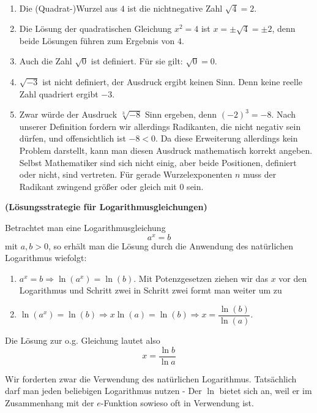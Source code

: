 \documentclass[ngerman, 12pt]{nssheetxea}
\begin{document}
\begin{example} \ 
\begin{enumerate}
\item Die (Quadrat-)Wurzel aus $4$ ist die nichtnegative Zahl $\sqrt{4}=2$. 
\item Die Lösung der quadratischen Gleichung $x^2=4$ ist $x=\pm \sqrt{4}=\pm 2$, denn beide Lösungen führen zum Ergebnis von $4$. 
\item Auch die Zahl $\sqrt{0}$ ist definiert. Für sie gilt: $\sqrt{0}=0$.
\item $\sqrt{-3}$ ist nicht definiert, der Ausdruck ergibt keinen Sinn. Denn keine reelle Zahl quadriert ergibt $-3$. 
\item Zwar würde der Ausdruck $\sqrt[3]{-8}$ Sinn ergeben, denn $(-2)^3=-8$. Nach unserer Definition fordern wir allerdings Radikanten, die nicht negativ sein dürfen, und offensichtlich ist $-8<0$. Da diese Erweiterung allerdings kein Problem darstellt, kann man diesen Ausdruck mathematisch korrekt angeben. Selbst Mathematiker sind sich nicht einig, aber beide Positionen, definiert oder nicht, sind vertreten. Für gerade Wurzelexponenten $n$ muss der Radikant zwingend größer oder gleich mit $0$ sein.
\end{enumerate}
\end{example}


\begin{theorem} \textbf{(Lösungsstrategie für Logarithmusgleichungen)} \par
Betrachtet man eine Logarithmusgleichung 
\[ a^x = b\]
mit $a,b>0$, so erhält man die Lösung durch die Anwendung des natürlichen Logarithmus wiefolgt:
\begin{enumerate}
\item $a^x = b \Rightarrow \ln (a^x) = \ln (b)$. Mit Potenzgesetzen ziehen wir das $x$ vor den Logarithmus und Schritt zwei in Schritt zwei formt man weiter um zu
\item $\ln (a^x) = \ln (b) \Rightarrow x \ln(a) = \ln (b) \Rightarrow x = \dfrac{\ln(b)}{\ln(a)}$.
\end{enumerate}
Die Lösung zur o.g. Gleichung lautet also
\[ x=\dfrac{\ln b}{\ln a}\]
\label{Satz:LogGleichung}
\end{theorem}
Wir forderten zwar die Verwendung des natürlichen Logarithmus. Tatsächlich darf man jeden beliebigen Logarithmus nutzen - Der $\ln$ bietet sich an, weil er im Zusammenhang mit der $e$-Funktion sowieso oft in Verwendung ist.
\end{document}
